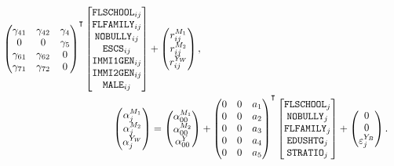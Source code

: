 \documentclass[a4paper,11pt,UKenglish,twoside,openright]{report}\usepackage[]{graphicx}\usepackage[]{color}
\begin{document}
\begin{equation}
\begin{aligned}
\begin{pmatrix}
            \gamma_{41}  &\gamma_{42}   &\gamma_4\\
            0  &0   &\gamma_5\\
            \gamma_{61}  &\gamma_{62}   &0\\
            \gamma_{71}  &\gamma_{72}   &0
        \end{pmatrix}\Ts
        \begin{bmatrix}
            \texttt{FLSCHOOL}_{ij}\\
            \texttt{FLFAMILY}_{ij}\\
            \texttt{NOBULLY}_{ij}\\
            \texttt{ESCS}_{ij}\\
            \texttt{IMMI1GEN}_{ij}\\
            \texttt{IMMI2GEN}_{ij}\\
            \texttt{MALE}_{ij}
        \end{bmatrix} +
        \begin{pmatrix}
            r^{M_1}_{ij}\\
            r^{M_2}_{ij}\\
            r^{Y_W}_{ij}
        \end{pmatrix},\\
        \begin{pmatrix}
            \alpha^{M_1}_{j}\\
            \alpha^{M_2}_{j}\\
            \alpha^{Y_W}_{j}\\
        \end{pmatrix} =
        \begin{pmatrix}
            \alpha^{M_1}_{00}\\
            \alpha^{M_2}_{00}\\
            \alpha^Y_{00}
        \end{pmatrix} &+
        \begin{pmatrix}
            0   &0  &a_1\\
            0   &0  &a_2\\
            0   &0  &a_3\\
            0   &0  &a_4\\
            0   &0  &a_5
        \end{pmatrix}\Ts
        \begin{bmatrix}
            \texttt{FLSCHOOL}_j\\
            \texttt{NOBULLY}_j\\
            \texttt{FLFAMILY}_j\\
            \texttt{EDUSHTG}_j\\
            \texttt{STRATIO}_j
        \end{bmatrix} +
        \begin{pmatrix}
            0\\
            0\\
            \epsilon^{Y_B}_j
        \end{pmatrix}.
    \end{aligned}
\end{equation}
\end{document}
